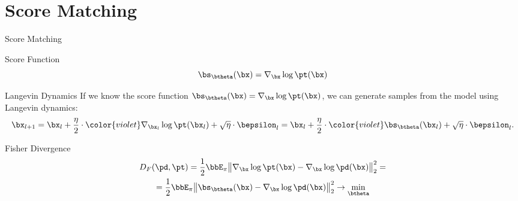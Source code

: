 \documentclass{beamer}
\begin{document}
\section{Score Matching}
\begin{frame}{Score Matching}
	\begin{block}{Score Function}
		\vspace{-0.3cm}
		 \[
			 \bs_{\btheta}(\bx) = \nabla_{\bx}\log \pt(\bx)
		 \]
		\vspace{-0.5cm}
	\end{block}
	\eqpause
	\begin{block}{Langevin Dynamics}
		If we know the score function $\bs_{\btheta}(\bx) = \nabla_{\bx}\log \pt(\bx)$, we can generate samples from the model using Langevin dynamics:
		\[
			\bx_{l + 1} = \bx_l + \frac{\eta}{2} \cdot {\color{violet}\nabla_{\bx_l} \log \pt(\bx_l)} + \sqrt{\eta} \cdot \bepsilon_l = \bx_l + \frac{\eta}{2} \cdot {\color{violet}\bs_{\btheta}(\bx_l)} + \sqrt{\eta} \cdot \bepsilon_l.
		\]
		\vspace{-0.5cm}
	\end{block}
	\eqpause
	\begin{block}{Fisher Divergence}
		\vspace{-0.7cm}
		\begin{multline*}
			D_F(\pd, \pt) = \frac{1}{2}\bbE_{\pi}\big\| \nabla_{\bx}\log \pt(\bx) - \nabla_\bx \log \pd(\bx) \big\|^2_2 =\\
			= \frac{1}{2}\bbE_{\pi}\big\| \bs_{\btheta}(\bx) - \nabla_\bx \log \pd(\bx) \big\|^2_2 \rightarrow \min_{\btheta}
		\end{multline*}
		\vspace{-0.3cm}
	\end{block}
\end{frame}
\end{document}
